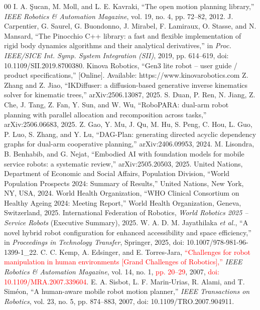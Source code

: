 \documentclass[conference]{IEEEtran}
\begin{document}
\begin{thebibliography}{00}
 I. A. {\c{S}}ucan, M. Moll, and L. E. Kavraki, ``The open motion planning library,'' \textit{IEEE Robotics \& Automation Magazine}, vol. 19, no. 4, pp. 72--82, 2012.
 J. Carpentier, G. Saurel, G. Buondonno, J. Mirabel, F. Lamiraux, O. Stasse, and N. Mansard, ``The Pinocchio C++ library: a fast and flexible implementation of rigid body dynamics algorithms and their analytical derivatives,'' in \textit{Proc. IEEE/SICE Int. Symp. System Integration (SII)}, 2019, pp. 614--619, doi: 10.1109/SII.2019.8700380.
 Kinova Robotics, ``Gen3 lite robot -- user guide / product specifications,'' [Online]. Available: https://www.kinovarobotics.com
 Z. Zhang and Z. Jiao, ``IKDiffuser: a diffusion-based generative inverse kinematics solver for kinematic trees,'' arXiv:2506.13087, 2025.
 S. Duan, P. Ren, N. Jiang, Z. Che, J. Tang, Z. Fan, Y. Sun, and W. Wu, ``RoboPARA: dual-arm robot planning with parallel allocation and recomposition across tasks,'' arXiv:2506.06683, 2025.
 Z. Gao, Y. Mu, J. Qu, M. Hu, S. Peng, C. Hou, L. Guo, P. Luo, S. Zhang, and Y. Lu, ``DAG-Plan: generating directed acyclic dependency graphs for dual-arm cooperative planning,'' arXiv:2406.09953, 2024.
 M. Lisondra, B. Benhabib, and G. Nejat, ``Embodied AI with foundation models for mobile service robots: a systematic review,'' arXiv:2505.20503, 2025.
 United Nations, Department of Economic and Social Affairs, Population Division, ``World Population Prospects 2024: Summary of Results,'' United Nations, New York, NY, USA, 2024.
 World Health Organization, ``WHO Clinical Consortium on Healthy Ageing 2024: Meeting Report,'' World Health Organization, Geneva, Switzerland, 2025.
 International Federation of Robotics, \textit{World Robotics 2025 -- Service Robots} (Executive Summary), 2025.
 W. A. D. M. Jayathilaka \textit{et al.}, ``A novel hybrid robot configuration for enhanced accessibility and space efficiency,'' in \textit{Proceedings in Technology Transfer}, Springer, 2025, doi: 10.1007/978-981-96-1399-1\_22.
 C. C. Kemp, A. Edsinger, and E. Torres-Jara, \textcolor{red}{``Challenges for robot manipulation in human environments [Grand Challenges of Robotics],''} \textit{IEEE Robotics \& Automation Magazine}, vol. 14, no. 1, \textcolor{red}{pp. 20--29}, 2007, \textcolor{red}{doi: 10.1109/MRA.2007.339604}.
 E. A. Sisbot, L. F. Marin-Urias, R. Alami, and T. Sim{\'e}on, ``A human-aware mobile robot motion planner,'' \textit{IEEE Transactions on Robotics}, vol. 23, no. 5, pp. 874--883, 2007, doi: 10.1109/TRO.2007.904911.

\end{thebibliography}
\end{document}
